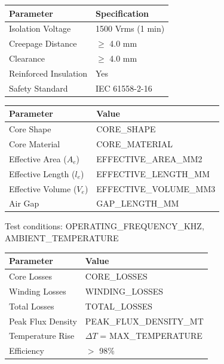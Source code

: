 \documentclass[10pt,a4paper]{article}
\begin{document}
\begin{minipage}[t]{0.48\textwidth}
\footnotesize
\begin{tabular}{|l|l|}
\hline
\rowcolor{lightgray}
\textbf{Parameter} & \textbf{Specification} \\
\hline
Isolation Voltage & 1500 Vrms (1 min) \\
\hline
Creepage Distance & $\geq$ 4.0 mm \\
\hline
Clearance & $\geq$ 4.0 mm \\
\hline
Reinforced Insulation & Yes \\
\hline
Safety Standard & IEC 61558-2-16 \\
\hline
\end{tabular}

\end{minipage}
\hfill
\begin{minipage}[t]{0.48\textwidth}

\noindent{\large\bfseries\textcolor{headerblue}{Core Data}}
\vspace{2mm}

\footnotesize
\begin{tabular}{|l|l|}
\hline
\rowcolor{lightgray}
\textbf{Parameter} & \textbf{Value} \\
\hline
Core Shape & {{CORE_SHAPE}} \\
\hline
Core Material & {{CORE_MATERIAL}} \\
\hline
Effective Area ($A_e$) & {{EFFECTIVE_AREA_MM2}} \\
\hline
Effective Length ($l_e$) & {{EFFECTIVE_LENGTH_MM}} \\
\hline
Effective Volume ($V_e$) & {{EFFECTIVE_VOLUME_MM3}} \\
\hline
Air Gap & {{GAP_LENGTH_MM}} \\
\hline
\end{tabular}

\vspace{5mm}

\noindent{\large\bfseries\textcolor{headerblue}{Performance}}
\vspace{2mm}

Test conditions: {{OPERATING_FREQUENCY_KHZ}}, {{AMBIENT_TEMPERATURE}}

\footnotesize
\begin{tabular}{|l|l|}
\hline
\rowcolor{lightgray}
\textbf{Parameter} & \textbf{Value} \\
\hline
Core Losses & {{CORE_LOSSES}} \\
\hline
Winding Losses & {{WINDING_LOSSES}} \\
\hline
Total Losses & {{TOTAL_LOSSES}} \\
\hline
Peak Flux Density & {{PEAK_FLUX_DENSITY_MT}} \\
\hline
Temperature Rise & $\Delta T$ = {{MAX_TEMPERATURE}} \\
\hline
Efficiency & $>$ 98\% \\
\hline
\end{tabular}


\end{minipage}
\end{document}
